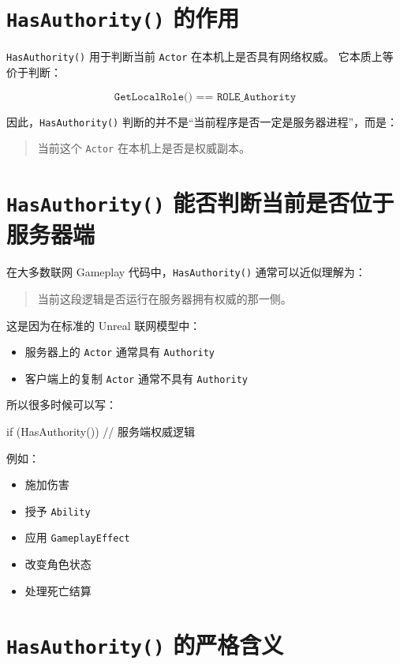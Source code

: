 \section{\texttt{HasAuthority()} 的作用}

\texttt{HasAuthority()} 用于判断当前 \texttt{Actor} 在本机上是否具有网络权威。  
它本质上等价于判断：

\[
\texttt{GetLocalRole() == ROLE\_Authority}
\]

因此，\texttt{HasAuthority()} 判断的并不是“当前程序是否一定是服务器进程”，而是：

\begin{quote}
	当前这个 \texttt{Actor} 在本机上是否是权威副本。
\end{quote}

\section{\texttt{HasAuthority()} 能否判断当前是否位于服务器端}

在大多数联网 Gameplay 代码中，\texttt{HasAuthority()} 通常可以近似理解为：

\begin{quote}
	当前这段逻辑是否运行在服务器拥有权威的那一侧。
\end{quote}

这是因为在标准的 Unreal 联网模型中：

\begin{itemize}
	\item 服务器上的 \texttt{Actor} 通常具有 \texttt{Authority}
	\item 客户端上的复制 \texttt{Actor} 通常不具有 \texttt{Authority}
\end{itemize}

所以很多时候可以写：

\begin{code}
	if (HasAuthority())
	{
		// 服务端权威逻辑
	}
\end{code}

例如：

\begin{itemize}
	\item 施加伤害
	\item 授予 \texttt{Ability}
	\item 应用 \texttt{GameplayEffect}
	\item 改变角色状态
	\item 处理死亡结算
\end{itemize}

\section{\texttt{HasAuthority()} 的严格含义}

